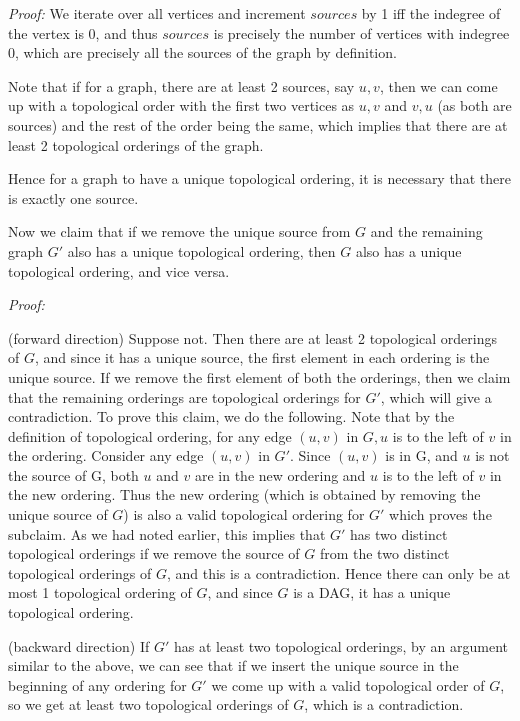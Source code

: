 \documentclass[answers]{exam}
\begin{document}
\begin{questions}
\begin{solution}
    \textit{Proof:} We iterate over all vertices and increment $sources$ by 1 iff the indegree of the vertex is 0, and thus $sources$ is precisely the number of vertices with indegree 0, which are precisely all the sources of the graph by definition.

Note that if for a graph, there are at least 2 sources, say $u, v$, then we can come up with a topological order with the first two vertices as $u, v$ and $v, u$ (as both are sources) and the rest of the order being the same, which implies that there are at least 2 topological orderings of the graph.

Hence for a graph to have a unique topological ordering, it is necessary that there is exactly one source.

Now we claim that if we remove the unique source from $G$ and the remaining graph $G'$ also has a unique topological ordering, then $G$ also has a unique topological ordering, and vice versa.

\textit{Proof:}

(forward direction) Suppose not. Then there are at least 2 topological orderings of $G$, and since it has a unique source, the first element in each ordering is the unique source. If
we remove the first element of both the orderings, then we claim that the remaining orderings are topological orderings for $G'$, which will give a contradiction. To prove this claim, we do the following.
Note that by the definition of topological ordering, for any edge $(u, v)$ in $G, u$ is to the left of $v$ in the ordering. Consider any edge $(u, v)$ in $G'$. Since $(u, v)$ is in G, and $u$ is not
the source of G, both $u$ and $v$ are in the new ordering and $u$ is to the left of $v$ in the new ordering. Thus the new ordering (which is obtained by removing the unique source of $G$) is also a
valid topological ordering for $G'$ which proves the subclaim. As we had noted earlier, this implies that $G'$ has two distinct topological orderings if we remove the source of $G$ from the two
distinct topological orderings of $G$, and this is a contradiction. Hence there can only be at most 1 topological ordering of $G$, and since $G$ is a DAG, it has a unique topological ordering.

(backward direction) If $G'$ has at least two topological orderings, by an argument similar to the above, we can see that if we insert the unique source in the beginning of any ordering for $G'$ we
come up with a valid topological order of $G$, so we get at least two topological orderings of $G$, which is a contradiction.


\end{solution}
\end{questions}
\end{document}
